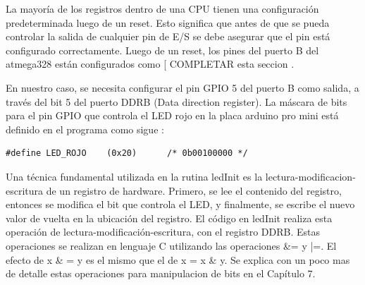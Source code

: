 \documentclass[12pt]{article}
\begin{document}

La mayoría de los registros dentro de una CPU tienen una configuración
predeterminada luego de un reset.
Esto significa que antes de que se pueda controlar la salida de cualquier
pin de E/S se debe asegurar que el pin está configurado correctamente.
Luego de un reset, los pines del puerto B del atmega328 están configurados
como [ COMPLETAR esta seccion . 


En nuestro caso, se necesita configurar el pin GPIO 5 del puerto B como 
salida, a través del bit 5 del puerto DDRB (Data direction register).
La máscara de bits para el pin GPIO que controla el LED rojo en la
placa arduino pro mini está definido en el programa como sigue :

\begin{verbatim}
#define LED_ROJO	(0x20)		/* 0b00100000 */
\end{verbatim}

Una técnica fundamental utilizada en la rutina ledInit es la lectura-modificacion-escritura de un registro de hardware.
Primero, se lee el contenido del registro, entonces se modifica el bit que controla el LED, y finalmente, se escribe el nuevo valor de vuelta en la ubicación
del registro.
El código en ledInit realiza esta operación de lectura-modificación-escritura,
con el registro DDRB. Estas operaciones se realizan en lenguaje C utilizando
las operaciones \&= y |=. El efecto de x \& = y es el mismo que el de
x = x \& y. Se explica con un poco mas de detalle estas operaciones para manipulacion
de bits en el Capítulo 7.
\end{document}
